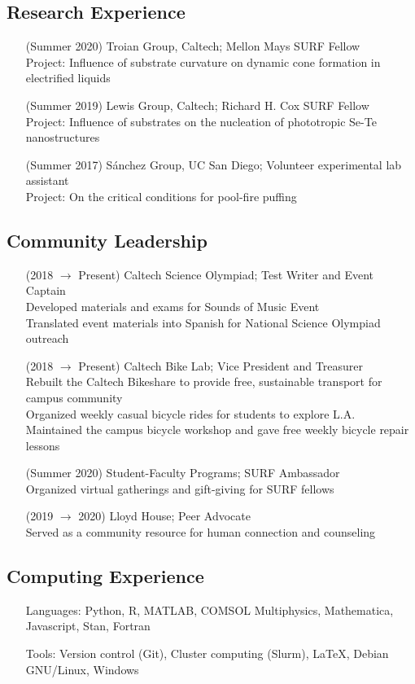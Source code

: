 \documentclass{article}
\begin{document}
\nocite{*}
\printbibliography[title={Publications}, heading=subbibliography]


\subsection*{Research Experience}

\begin{enumerate}
    \item [(Summer 2020)] Troian Group, Caltech; Mellon Mays SURF Fellow \\
        Project: Influence of substrate curvature on dynamic cone formation in electrified liquids
    \item [(Summer 2019)] Lewis Group, Caltech; Richard H. Cox SURF Fellow \\
        Project: Influence of substrates on the nucleation of phototropic Se-Te nanostructures
    \item [(Summer 2017)] Sánchez Group, UC San Diego; Volunteer experimental lab assistant \\
        Project: On the critical conditions for pool-fire puffing
\end{enumerate}


\subsection*{Community Leadership}

\begin{enumerate}
    \item [(2018 $\to$ Present)] Caltech Science Olympiad; Test Writer and Event Captain \\
        Developed materials and exams for Sounds of Music Event \\
        Translated event materials into Spanish for National Science Olympiad outreach
    \item [(2018 $\to$ Present)] Caltech Bike Lab; Vice President and Treasurer \\
        Rebuilt the Caltech Bikeshare to provide free, sustainable transport for campus community \\
        Organized weekly casual bicycle rides for students to explore L.A. \\
        Maintained the campus bicycle workshop and gave free weekly bicycle repair lessons
    \item [(Summer 2020)] Student-Faculty Programs; SURF Ambassador \\
        Organized virtual gatherings and gift-giving for SURF fellows
    \item [(2019 $\to$ 2020)] Lloyd House; Peer Advocate \\
        Served as a community resource for human connection and counseling
\end{enumerate}


\subsection*{Computing Experience}

\begin{enumerate}
    \item [Languages:] Python, R, MATLAB, COMSOL Multiphysics, Mathematica, Javascript, Stan, Fortran
    \item [Tools:] Version control (Git), Cluster computing (Slurm), \LaTeX, Debian GNU/Linux, Windows
\end{enumerate}
\end{document}
